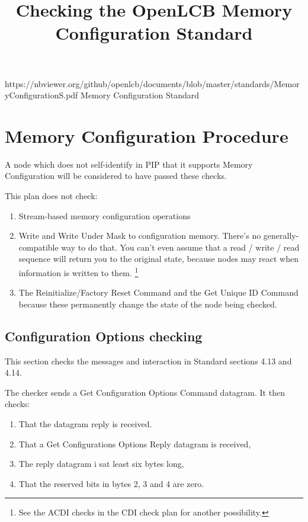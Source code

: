 

\title{Checking the OpenLCB Memory Configuration Standard}


\maketitle

\introductionCaveats
    {https://nbviewer.org/github/openlcb/documents/blob/master/standards/MemoryConfigurationS.pdf}
    {Memory Configuration Standard}

\section{Memory Configuration Procedure}


A node which does not self-identify in PIP that it supports
Memory Configuration will be considered to have passed these checks.
\pipsetFootnote

This plan does not check:
\begin{enumerate}
\item Stream-based memory configuration operations
\item Write and Write Under Mask to configuration memory.  
There's no generally-compatible way to do that.
You can't even assume that a read / write / read sequence will return you to the original
state, because nodes may react when information is written to them.
\footnote{See the ACDI checks in the CDI check plan for another possibility.}
\item The Reinitialize/Factory Reset Command and the Get Unique ID Command
because these permanently change the state of the node being checked.
\end{enumerate}

\subsection{Configuration Options checking}

This section checks the messages and interaction in Standard sections 4.13 and 4.14.

The checker sends a Get Configuration Options Command datagram.  It then checks:
\begin{enumerate}
\item That the datagram reply is received.
\item That a Get Configurations Options Reply datagram is received,
\item The reply datagram i sat least six bytes long,
\item That the reserved bits in bytes 2, 3 and 4 are zero.
\end{enumerate}

